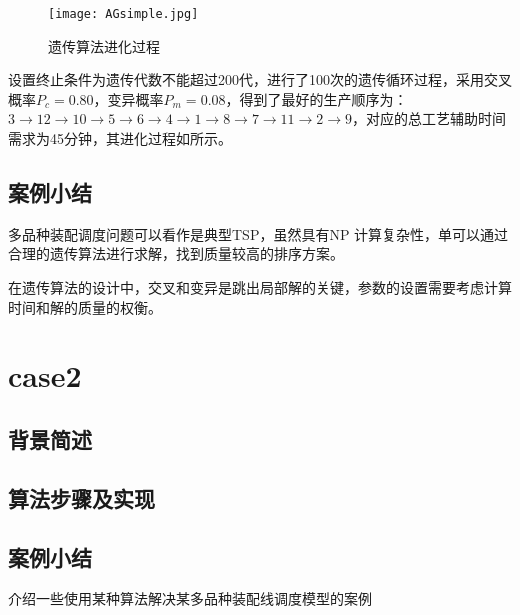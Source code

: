 \begin{figure}[h]
\centering
\texttt{[image: AGsimple.jpg]}
\caption{遗传算法进化过程\label{fig:AGsimple}}
\end{figure}

设置终止条件为遗传代数不能超过200代，进行了100次的遗传循环过程，采用交叉概率$P_c = 0.80$，变异概率$P_m = 0.08$，得到了最好的生产顺序为：$3\rightarrow12\rightarrow10\rightarrow5\rightarrow6\rightarrow4\rightarrow1\rightarrow8\rightarrow7\rightarrow11\rightarrow2\rightarrow9$，对应的总工艺辅助时间需求为45分钟，其进化过程如所示。

\subsection{案例小结}
多品种装配调度问题可以看作是典型TSP，虽然具有NP 计算复杂性，单可以通过合理的遗传算法进行求解，找到质量较高的排序方案。

在遗传算法的设计中，交叉和变异是跳出局部解的关键，参数的设置需要考虑计算时间和解的质量的权衡。

\section{case2}
\subsection{背景简述}
\subsection{算法步骤及实现}
\subsection{案例小结}
介绍一些使用某种算法解决某多品种装配线调度模型的案例